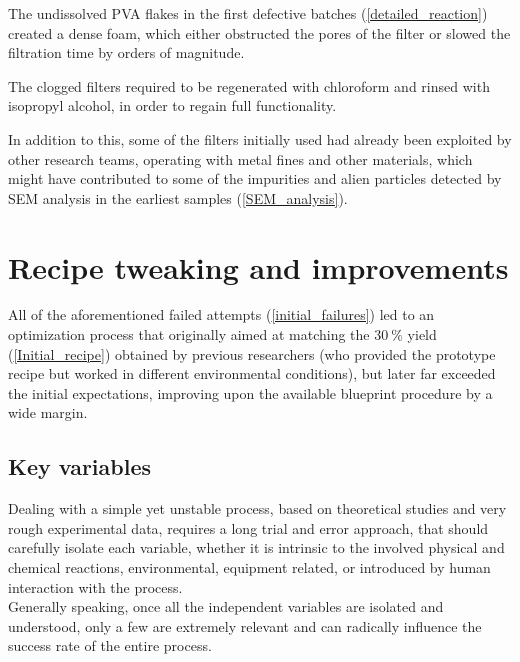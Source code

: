 \documentclass{article}
\begin{document}
        The undissolved PVA flakes in the first defective batches (\ref{detailed_reaction}) created a dense foam, which either obstructed 
        the pores of the filter or slowed the filtration time by orders of magnitude. 

        The clogged filters required to be regenerated with chloroform and rinsed with isopropyl alcohol, in order to regain full 
        functionality. 

        In addition to this, some of the filters initially used had already been exploited by other research teams, operating 
        with metal fines and other materials, which might have contributed to some of the impurities and alien particles detected 
        by SEM analysis in the earliest samples (\ref{SEM_analysis}). \\ 




    \clearpage

    \section{Recipe tweaking and improvements\label{recipe_improvement}}

    All of the aforementioned failed attempts (\ref{initial_failures}) led to an optimization process that originally aimed at 
    matching the $30 \ \%$ yield (\ref{Initial_recipe}) obtained by previous researchers (who provided 
    the prototype recipe but worked in different environmental conditions), but later far exceeded the 
    initial expectations, improving upon the available blueprint procedure by a wide margin. 


        \subsection{Key variables\label{key_variables}}

        Dealing with a simple yet unstable process, based on theoretical studies and very rough experimental data, requires a
        long trial and error approach, that should carefully isolate each variable, whether it is intrinsic to the 
        involved physical and chemical reactions, environmental, equipment related, or introduced by human 
        interaction with the process. \\ 

        Generally speaking, once all the independent variables are isolated and understood, only a few are extremely relevant and can 
        radically influence the success rate of the entire process. 
\end{document}
